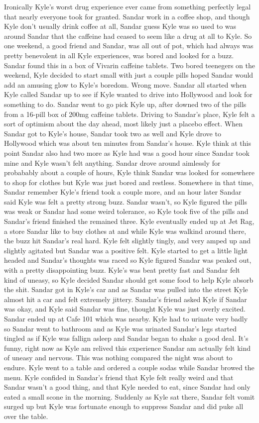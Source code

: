 \documentclass[12pt]{book}
\begin{document}
Ironically Kyle's worst drug experience ever came from something perfectly legal that nearly everyone took for granted. Sandar work in a coffee shop, and though Kyle don't usually drink coffee at all, Sandar guess Kyle was so used to was around Sandar that the caffeine had ceased to seem like a drug at all to Kyle. So one weekend, a good friend and Sandar, was all out of pot, which had always was pretty benevolent in all Kyle experiences, was bored and looked for a buzz. Sandar found this in a box of Vivarin caffeine tablets. Two bored teenegers on the weekend, Kyle decided to start small with just a couple pills hoped Sandar would add an amusing glow to Kyle's boredom. Wrong move. Sandar all started when Kyle called Sandar up to see if Kyle wanted to drive into Hollywood and look for something to do. Sandar went to go pick Kyle up, after downed two of the pills from a 16-pill box of 200mg caffeine tablets. Driving to Sandar's place, Kyle felt a sort of optimism about the day ahead, most likely just a placebo effect. When Sandar got to Kyle's house, Sandar took two as well and Kyle drove to Hollywood which was about ten minutes from Sandar's house. Kyle think at this point Sandar also had two more as Kyle had was a good hour since Sandar took mine and Kyle wasn't felt anything. Sandar drove around aimlessly for probabably about a couple of hours, Kyle think Sandar was looked for somewhere to shop for clothes but Kyle was just bored and restless. Somewhere in that time, Sandar remember Kyle's friend took a couple more, and an hour later Sandar said Kyle was felt a pretty strong buzz. Sandar wasn't, so Kyle figured the pills was weak or Sandar had some weird tolerance, so Kyle took five of the pills and Sandar's friend finished the remained three. Kyle eventually ended up at Jet Rag, a store Sandar like to buy clothes at and while Kyle was walkind around there, the buzz hit Sandar's real hard. Kyle felt slightly tingly, and very amped up and slightly agitated but Sandar was a positive felt. Kyle started to get a little light headed and Sandar's thoughts was raced so Kyle figured Sandar was peaked out, with a pretty disappointing buzz. Kyle's was beat pretty fast and Sandar felt kind of uneasy, so Kyle decided Sandar should get some food to help Kyle absorb the shit. Sandar got in Kyle's car and as Sandar was pulled into the street Kyle almost hit a car and felt extremely jittery. Sandar's friend asked Kyle if Sandar was okay, and Kyle said Sandar was fine, thought Kyle was just overly excited. Sandar ended up at Cafe 101 which was nearby. Kyle had to urinate very badly so Sandar went to bathroom and as Kyle was urinated Sandar's legs started tingled as if Kyle was fallign asleep and Sandar began to shake a good deal. It's funny, right now as Kyle am relived this experience Sandar am actually felt kind of uneasy and nervous. This was nothing compared the night was about to endure. Kyle went to a table and ordered a couple sodas while Sandar browed the menu. Kyle confided in Sandar's friend that Kyle felt really weird and that Sandar wasn't a good thing, and that Kyle needed to eat, since Sandar had only eated a small scone in the morning. Suddenly as Kyle sat there, Sandar felt vomit surged up but Kyle was fortunate enough to suppress Sandar and did puke all over the table. 
\end{document}

